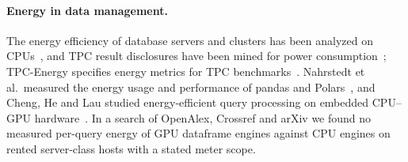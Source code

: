 \documentclass[sigconf]{acmart}
\begin{document}
\paragraph{Energy in data management.}
The energy efficiency of database servers and clusters has been analyzed on
CPUs~\cite{tsirogiannis2010energy,lang2012cluster,xu2010power}, and TPC result disclosures
have been mined for power consumption~\cite{poess2008energy}; TPC-Energy specifies energy
metrics for TPC benchmarks~\cite{tpcenergy150}.
Nahrstedt et al.\ measured the energy usage and performance of pandas and
Polars~\cite{nahrstedt2024polars}, and Cheng, He and Lau studied energy-efficient query processing
on embedded CPU--GPU hardware~\cite{cheng2015embedded}. In a search of OpenAlex, Crossref and arXiv
we found no measured per-query energy of GPU dataframe engines against CPU engines on rented
server-class hosts with a stated meter scope.
\end{document}
